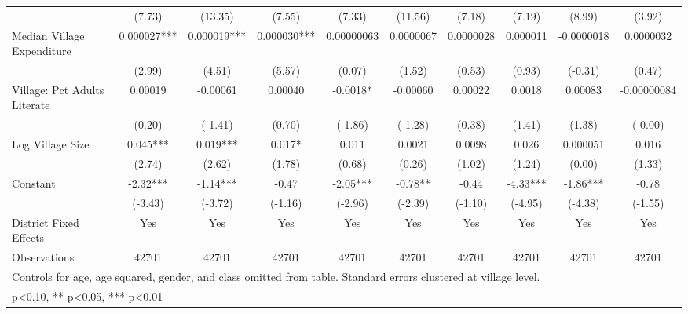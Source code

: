 \begin{sidewaystable}[htbp]
\begin{tabular}{l*{9}{c}}
                &   (7.73)   &  (13.35)   &   (7.55)   &   (7.33)   &  (11.56)   &   (7.18)   &   (7.19)   &   (8.99)   &   (3.92)   \\
Median Village Expenditure& 0.000027***& 0.000019***& 0.000030***&0.00000063   &0.0000067   &0.0000028   & 0.000011   &-0.0000018   &0.0000032   \\
                &   (2.99)   &   (4.51)   &   (5.57)   &   (0.07)   &   (1.52)   &   (0.53)   &   (0.93)   &  (-0.31)   &   (0.47)   \\
Village: Pct Adults Literate&  0.00019   & -0.00061   &  0.00040   &  -0.0018*  & -0.00060   &  0.00022   &   0.0018   &  0.00083   &-0.00000084   \\
                &   (0.20)   &  (-1.41)   &   (0.70)   &  (-1.86)   &  (-1.28)   &   (0.38)   &   (1.41)   &   (1.38)   &  (-0.00)   \\
Log Village Size&    0.045***&    0.019***&    0.017*  &    0.011   &   0.0021   &   0.0098   &    0.026   & 0.000051   &    0.016   \\
                &   (2.74)   &   (2.62)   &   (1.78)   &   (0.68)   &   (0.26)   &   (1.02)   &   (1.24)   &   (0.00)   &   (1.33)   \\
Constant        &    -2.32***&    -1.14***&    -0.47   &    -2.05***&    -0.78** &    -0.44   &    -4.33***&    -1.86***&    -0.78   \\
                &  (-3.43)   &  (-3.72)   &  (-1.16)   &  (-2.96)   &  (-2.39)   &  (-1.10)   &  (-4.95)   &  (-4.38)   &  (-1.55)   \\
District Fixed Effects&      Yes   &      Yes   &      Yes   &      Yes   &      Yes   &      Yes   &      Yes   &      Yes   &      Yes   \\
\midrule
Observations    &    42701   &    42701   &    42701   &    42701   &    42701   &    42701   &    42701   &    42701   &    42701   \\
\bottomrule
\multicolumn{10}{l}{\footnotesize Controls for age, age squared, gender, and class omitted from table. Standard errors clustered at village level.}\\
\multicolumn{10}{l}{\footnotesize * p<0.10, ** p<0.05, *** p<0.01}\\
\end{tabular}
\end{sidewaystable}
